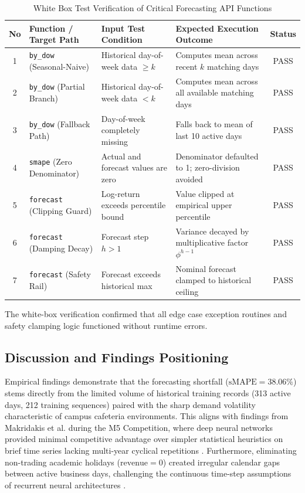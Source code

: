 \documentclass[10pt,a4paper]{article}
\begin{document}
\begin{table}[htbp]
  \centering
  \caption{White Box Test Verification of Critical Forecasting API Functions}
  \label{tab:whitebox}
  \fontsize{8pt}{10pt}\selectfont
  \begin{tabularx}{\textwidth}{clXXc}
    \toprule
    \textbf{No} & \textbf{Function / Target Path} & \textbf{Input Test Condition} & \textbf{Expected Execution Outcome} & \textbf{Status} \\
    \midrule
    1 & \texttt{by\_dow} (Seasonal-Naive) & Historical day-of-week data $\ge k$ & Computes mean across recent $k$ matching days & PASS \\
    2 & \texttt{by\_dow} (Partial Branch)  & Historical day-of-week data $< k$   & Computes mean across all available matching days & PASS \\
    3 & \texttt{by\_dow} (Fallback Path)   & Day-of-week completely missing      & Falls back to mean of last 10 active days & PASS \\
    4 & \texttt{smape} (Zero Denominator) & Actual and forecast values are zero & Denominator defaulted to 1; zero-division avoided & PASS \\
    5 & \texttt{forecast} (Clipping Guard)& Log-return exceeds percentile bound & Value clipped at empirical upper percentile & PASS \\
    6 & \texttt{forecast} (Damping Decay) & Forecast step $h > 1$               & Variance decayed by multiplicative factor $\phi^{h-1}$ & PASS \\
    7 & \texttt{forecast} (Safety Rail)   & Forecast exceeds historical max     & Nominal forecast clamped to historical ceiling & PASS \\
    \bottomrule
  \end{tabularx}
\end{table}

The white-box verification confirmed that all edge case exception routines and safety clamping logic functioned without runtime errors.

\subsection{Discussion and Findings Positioning}
Empirical findings demonstrate that the forecasting shortfall ($\text{sMAPE} = 38.06\%$) stems directly from the limited volume of historical training records (313 active days, 212 training sequences) paired with the sharp demand volatility characteristic of campus cafeteria environments. This aligns with findings from Makridakis et al. during the M5 Competition, where deep neural networks provided minimal competitive advantage over simpler statistical heuristics on brief time series lacking multi-year cyclical repetitions \cite{makridakis2022}. Furthermore, eliminating non-trading academic holidays ($\text{revenue} = 0$) created irregular calendar gaps between active business days, challenging the continuous time-step assumptions of recurrent neural architectures \cite{box2015}.
\end{document}
